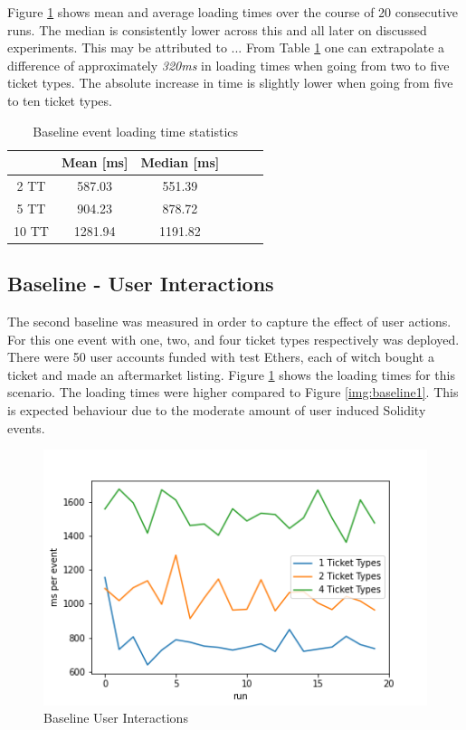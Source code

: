 Figure \ref{tab:baseline1} shows mean and average loading times over the course of 20 consecutive runs. The median is consistently lower across this and all later on discussed experiments. This may be attributed to ...
From Table \ref{tab:baseline1} one can extrapolate a difference of approximately \textit{320ms} in loading times when going from two to five ticket types. The absolute increase in time is slightly lower when going from five to ten ticket types.  

\begin{table}[ht]
\centering
\begin{tabular}{|c|c|c|c|c|c|}
\hline
 & \textbf{Mean [ms]} & \textbf{Median [ms]} \\ \hline
2 TT & 587.03               & 551.39         \\ \hline
5 TT & 904.23               & 878.72         \\ \hline
10 TT & 1281.94               & 1191.82         \\ \hline
\end{tabular}
\caption{Baseline event loading time statistics}
\label{tab:baseline1}
\end{table}

\subsection{Baseline - User Interactions}\label{section:bl-user}


The second baseline was measured in order to capture the effect of user actions. For this one event with one, two, and four ticket types respectively was deployed. There were 50 user accounts funded with test Ethers, each of witch bought a ticket and made an aftermarket listing. Figure \ref{img:baseline2} shows the loading times for this scenario. The loading times were higher compared to Figure \ref{img:baseline1}. This is expected behaviour due to the moderate amount of user induced Solidity events.
\begin{figure}[H]
    \centering
    \includegraphics[width=14cm]{images/plot2.png}
    \caption{Baseline User Interactions \protect\footnotemark}
    \label{img:baseline2}
\end{figure}

